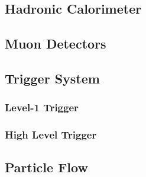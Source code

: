 \subsection{Hadronic Calorimeter} \label{sec:CMS_HCAL}

\subsection{Muon Detectors} \label{sec:CMS_Muons}

\subsection{Trigger System} \label{sec:CMS_trig}

\subsubsection{Level-1 Trigger} \label{sec:CMS_L1T}

\subsubsection{High Level Trigger} \label{sec:CMS_HLT}

\subsection{Particle Flow} \label{sec:CMS_PF}